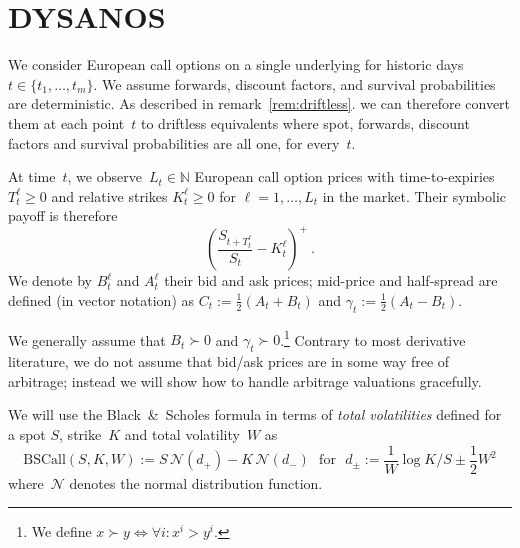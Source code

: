 \documentclass[11pt,a4paper]{article}
\newcommand{\N}{\mathbb{N}}
\newcommand{\BSCall}{\mathrm{BSCall}}
\begin{document}
\section{DYSANOS}

\label{sec:markets}


We consider European call options on a single underlying
for historic days $t\in \{t_1,\ldots,t_m\}$.
We assume forwards, discount factors, and survival probabilities
are deterministic. As described in remark~\ref{rem:driftless}.
 we can therefore convert them at each point~$t$ to driftless equivalents
where spot, forwards, discount factors and survival probabilities are all one, for every~$t$.


At time~$t$, we observe~$L_t\in\N$ 
European call option prices with time-to-expiries $T_t^\ell \geq 0$ and
relative strikes $K_t^\ell\geq 0$
for $\ell=1,\ldots,L_t$
in the market. Their symbolic payoff is therefore
$$
   \left(\frac{S_{t+T_t^\ell}}{S_t} - K_t^\ell \right)^+ \ .
$$
We denote by $B_t^{\ell}$ and $A_t^\ell$ their bid and ask prices;
mid-price and half-spread are defined (in vector notation) as
$C_t := \tfrac{1}{2}(A_t + B_t)$ and
$\gamma_t := \tfrac{1}{2}(A_t - B_t)$.

We generally assume that $B_t\succ0$ and $\gamma_t\succ0$.\footnote{
We define $x \succ y \Leftrightarrow \forall i: x^i > y^i$.}
Contrary to most derivative literature, we do not assume that bid/ask prices are in some way free of arbitrage; instead
we will show how to handle arbitrage valuations gracefully.

We will use the Black~\&~Scholes formula in terms of \emph{total volatilities} defined 
for a spot $S$, strike~$K$ and total volatility~$W$ as
\begin{equation}\label{eq:bs}
    \BSCall(S,K,W) := S\,\mathcal{N}( d_+ ) - K\,\mathcal{N}(d_-)
    \ \ \ \mbox{for} \ \ \
    d_\pm := \frac{ 1 }{ W } \log K/S \pm \frac12 W^2 
\end{equation}
where~$\mathcal{N}$ denotes the normal distribution function.
\end{document}
